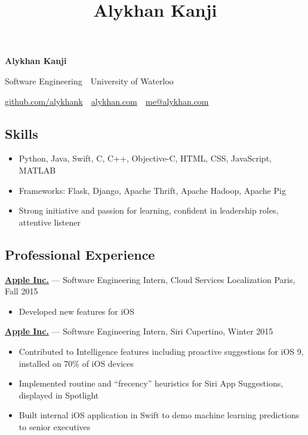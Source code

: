 \documentclass[pdftex,11pt,letterpaper]{article}
\title{Alykhan Kanji}
\begin{document}
\font

\begin{center}
  {\Huge \textbf{Alykhan Kanji}}

  {\large
    Software Engineering\ \textperiodcentered \ University of Waterloo

    \href{https://github.com/alykhank}{github.com/alykhank}\ \textperiodcentered \ \href{http://alykhan.com}{alykhan.com}\ \textperiodcentered \ \href{mailto:me@alykhan.com}{me@alykhan.com}
  }
\end{center}

\subsection*{Skills}

\begin{itemize}[before=,after=]
  \item Python, Java, Swift, C, C++, Objective-C, HTML, CSS, JavaScript, MATLAB
  \item Frameworks: Flask, Django, Apache Thrift, Apache Hadoop, Apache Pig
  \item Strong initiative and passion for learning, confident in leadership roles, attentive listener
\end{itemize}

\subsection*{Professional Experience}

\href{https://apple.com}{\textbf{Apple Inc.}} --- Software Engineering Intern, Cloud Services Localization \hfill {\color{gray} Paris, Fall 2015}
\begin{itemize}
  \item Developed new features for iOS
\end{itemize}

\href{https://apple.com}{\textbf{Apple Inc.}} --- Software Engineering Intern, Siri \hfill {\color{gray} Cupertino, Winter 2015}
\begin{itemize}
  \item Contributed to Intelligence features including proactive suggestions for iOS 9, installed on 70\% of iOS devices
  \item Implemented routine and ``frecency'' heuristics for Siri App Suggestions, displayed in Spotlight
  \item Built internal iOS application in Swift to demo machine learning predictions to senior executives
\end{itemize}
\end{document}
